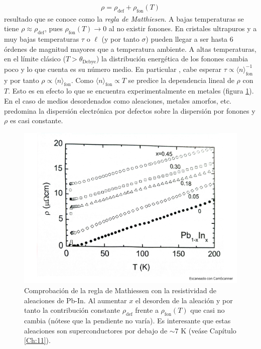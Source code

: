\begin{eqnarray}
	\rho = \rho_{\text{def}} + \rho_{\text{fon}} (T)
\end{eqnarray}
resultado que se conoce como la \textit{regla de Matthiesen}. A bajas temperaturas se tiene $\rho\approx \rho_{\text{def}}$, pues $\rho_{\text{fon}}(T)\rightarrow0$ al no existir fonones. En cristales ultrapuros y a muy bajas temperaturas $\tau$ o $\ell$ (y por tanto $\sigma$) pueden llegar a ser hasta 6 órdenes de magnitud mayores que a temperatura ambiente. A altas temperaturas, en el límite clásico ($T>\theta_{\text{Debye}}$) la distribución energética de los fonones cambia poco y lo que cuenta es su número medio. En particular , cabe esperar $\tau \propto \langle n \rangle_{\text{fon}}^{-1}$ y por tanto $\rho \propto \langle n \rangle_\text{fon}$. Como $\langle n \rangle_\text{fon} \propto T$ se predice la dependencia lineal de $\rho$ con $T$. Esto es en efecto lo que se encuentra experimentalmente en metales (figura \ref{Fig:06-06}). En el caso de medios desordenados como aleaciones, metales amorfos, etc. predomina la dispersión electrónica por defectos sobre la dispersión por fonones y $\rho$ es casi constante.

\begin{figure}[h!] \centering
    \includegraphics[scale=0.35]{Cuerpo/Ch_06/Fotos libro 6.pdf}
    \caption{Comprobación de la regla de Mathiessen con la resistividad de aleaciones de Pb-In. Al aumentar $x$ el desorden de la aleación y por tanto la contribución constante $\rho_{\text{def}}$ frente a $\rho_{\text{fon}} (T)$ que casi no cambia (nótese que la pendiente no varía). Es interesante que estas aleaciones son superconductores por debajo de $\sim 7$ K (veáse Capítulo \ref{Ch:11}).}
    \label{Fig:06-06}
\end{figure}  


